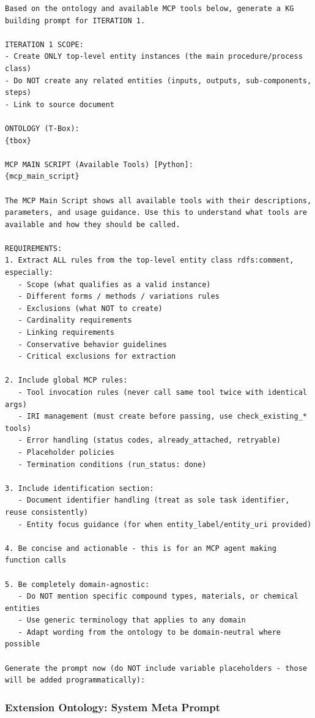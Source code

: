 \begin{lstlisting}
Based on the ontology and available MCP tools below, generate a KG building prompt for ITERATION 1.

ITERATION 1 SCOPE:
- Create ONLY top-level entity instances (the main procedure/process class)
- Do NOT create any related entities (inputs, outputs, sub-components, steps)
- Link to source document

ONTOLOGY (T-Box):
{tbox}

MCP MAIN SCRIPT (Available Tools) [Python]:
{mcp_main_script}

The MCP Main Script shows all available tools with their descriptions, parameters, and usage guidance. Use this to understand what tools are available and how they should be called.

REQUIREMENTS:
1. Extract ALL rules from the top-level entity class rdfs:comment, especially:
   - Scope (what qualifies as a valid instance)
   - Different forms / methods / variations rules
   - Exclusions (what NOT to create)
   - Cardinality requirements
   - Linking requirements
   - Conservative behavior guidelines
   - Critical exclusions for extraction

2. Include global MCP rules:
   - Tool invocation rules (never call same tool twice with identical args)
   - IRI management (must create before passing, use check_existing_* tools)
   - Error handling (status codes, already_attached, retryable)
   - Placeholder policies
   - Termination conditions (run_status: done)

3. Include identification section:
   - Document identifier handling (treat as sole task identifier, reuse consistently)
   - Entity focus guidance (for when entity_label/entity_uri provided)

4. Be concise and actionable - this is for an MCP agent making function calls

5. Be completely domain-agnostic:
   - Do NOT mention specific compound types, materials, or chemical entities
   - Use generic terminology that applies to any domain
   - Adapt wording from the ontology to be domain-neutral where possible

Generate the prompt now (do NOT include variable placeholders - those will be added programmatically):
\end{lstlisting}\label{lst:iter_1_meta_prompt}

 
\subsubsection{Extension Ontology: System Meta Prompt}


